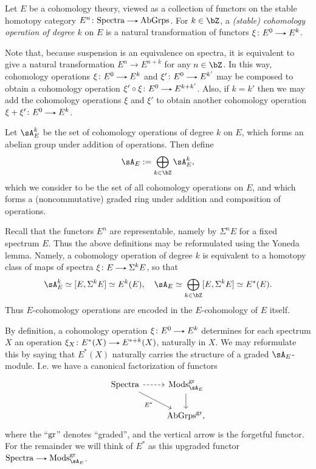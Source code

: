 \begin{definition}
  \label{ops-dfn}
  Let $E$ be a cohomology theory, viewed as a collection of functors on the stable homotopy category $E^n \c \Spectra \to \AbGrps$. For $k \in \bZ$, a \emph{(stable) cohomology operation of degree $k$} on $E$ is a natural transformation of functors $\xi \c E^0 \to E^k$.

  \begin{subnothing}
    \label{ops-dfn-ring-structure}
    Note that, because suspension is an equivalence on spectra, it is equivalent to give a natural transformation $E^n \to E^{n+k}$ for any $n \in \bZ$. In this way, cohomology operations $\xi \c E^0 \to E^k$ and $\xi' \c E^0 \to E^{k'}$ may be composed to obtain a cohomology operation $\xi' \circ \xi \c E^0 \to E^{k+k'}$. Also, if $k = k'$ then we may add the cohomology operations $\xi$ and $\xi'$ to obtain another cohomology operation $\xi + \xi' \c E^0 \to E^k$.
  \end{subnothing}

  \begin{subdefinition}
    \label{ops-dfn-ring-dfn}
    Let $\sA_E^k$ be the set of cohomology operations of degree $k$ on $E$, which forms an abelian group under addition of operations. Then define
    \[
      \sA_E \ce \bigoplus_{k \in \bZ} \sA_E^k,
    \]
    which we consider to be the set of all cohomology operations on $E$, and which forms a (noncommutative) graded ring under addition and composition of operations.
  \end{subdefinition}

  \begin{subremark}
    \label{ops-dfn-yoneda}
    Recall that the functors $E^n$ are representable, namely by $\Sigma^n E$ for a fixed spectrum $E$. Thus the above definitions may be reformulated using the Yoneda lemma. Namely, a cohomology operation of degree $k$ is equivalent to a homotopy class of maps of spectra $\xi \c E \to \Sigma^k E$, so that
    \[
      \sA_E^k \iso [E, \Sigma^k E] \iso E^k(E), \quad
      \sA_E \iso \bigoplus_{k \in \bZ} [E, \Sigma^k E] \iso E^*(E).
    \]
    Thus $E$-cohomology operations are encoded in the $E$-cohomology of $E$ itself.
  \end{subremark}

  \begin{subnothing}
    \label{ops-dfn-module}
    By definition, a cohomology operation $\xi \c E^0 \to E^k$ determines for each spectrum $X$ an operation $\xi_X \c E^*(X) \to E^{*+k}(X)$, naturally in $X$. We may reformulate this by saying that $E^*(X)$ naturally carries the structure of a graded $\sA_E$-module. I.e. we have a canonical factorization of functors
    \[
      \begin{tikzcd}
        \Spectra \ar[r, dashed] \ar[rd, "E^*", swap] &
        \Mods_{\sA_E}^\gr \ar[d] \\
        &
        \AbGrps^\gr,
      \end{tikzcd}
    \]
    where the ``$\mathrm{gr}$'' denotes ``graded'', and the vertical arrow is the forgetful functor. For the remainder we will think of $E^*$ as this upgraded functor $\Spectra \to \Mods_{\sA_E}^\gr$.
  \end{subnothing}
\end{definition}

